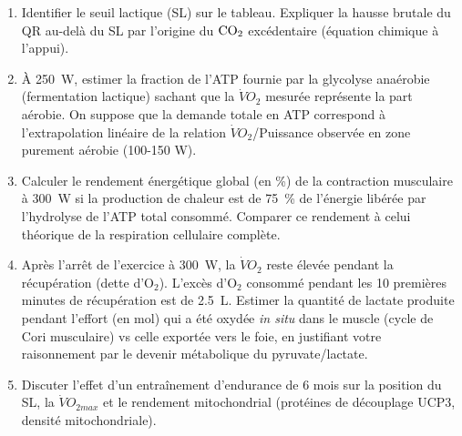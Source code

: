\documentclass[11pt]{article}
\begin{document}
\begin{exercice}
\begin{enumerate}
\item Identifier le seuil lactique (SL) sur le tableau. Expliquer la hausse brutale du QR au-delà du SL par l'origine du $\ce{CO2}$ excédentaire (équation chimique à l'appui).
\item À \SI{250}{\watt}, estimer la fraction de l'ATP fournie par la glycolyse anaérobie (fermentation lactique) sachant que la $\dot{V}O_2$ mesurée représente la part aérobie. On suppose que la demande totale en ATP correspond à l'extrapolation linéaire de la relation $\dot{V}O_2$/Puissance observée en zone purement aérobie (100-150 W).
\item Calculer le rendement énergétique global (en \%) de la contraction musculaire à \SI{300}{\watt} si la production de chaleur est de \SI{75}{\%} de l'énergie libérée par l'hydrolyse de l'ATP total consommé. Comparer ce rendement à celui théorique de la respiration cellulaire complète.
\item Après l'arrêt de l'exercice à \SI{300}{\watt}, la $\dot{V}O_2$ reste élevée pendant la récupération (dette d'O$_2$). L'excès d'O$_2$ consommé pendant les 10 premières minutes de récupération est de \SI{2,5}{\liter}. Estimer la quantité de lactate produite pendant l'effort (en mol) qui a été oxydée \textit{in situ} dans le muscle (cycle de Cori musculaire) vs celle exportée vers le foie, en justifiant votre raisonnement par le devenir métabolique du pyruvate/lactate.
\item Discuter l'effet d'un entraînement d'endurance de 6 mois sur la position du SL, la $\dot{V}O_{2max}$ et le rendement mitochondrial (protéines de découplage UCP3, densité mitochondriale).
\end{enumerate}
\end{exercice}
\end{document}
